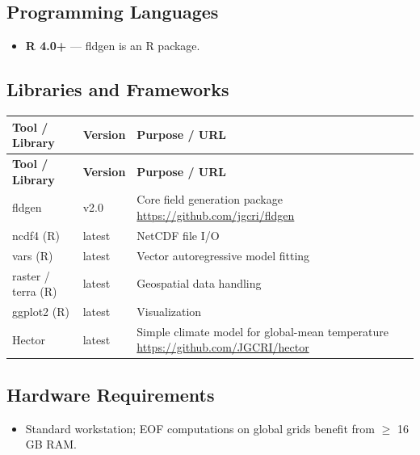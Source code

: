\documentclass[11pt,a4paper]{article}
\begin{document}
\subsection{Programming Languages}
\begin{itemize}
  \item \textbf{R 4.0+} --- fldgen is an R package.
\end{itemize}

\subsection{Libraries and Frameworks}
\begin{longtable}{p{4.5cm} p{2.5cm} p{6.5cm}}
\toprule
\textbf{Tool / Library} & \textbf{Version} & \textbf{Purpose / URL} \\
\midrule
\endfirsthead
\toprule
\textbf{Tool / Library} & \textbf{Version} & \textbf{Purpose / URL} \\
\midrule
\endhead
fldgen & v2.0 & Core field generation package \newline \url{https://github.com/jgcri/fldgen} \\
\midrule
ncdf4 (R) & latest & NetCDF file I/O \\
\midrule
vars (R) & latest & Vector autoregressive model fitting \\
\midrule
raster / terra (R) & latest & Geospatial data handling \\
\midrule
ggplot2 (R) & latest & Visualization \\
\midrule
Hector & latest & Simple climate model for global-mean temperature \newline \url{https://github.com/JGCRI/hector} \\
\bottomrule
\end{longtable}

\subsection{Hardware Requirements}
\begin{itemize}
  \item Standard workstation; EOF computations on global grids benefit from $\geq$ 16\,GB RAM.
\end{itemize}
\end{document}
